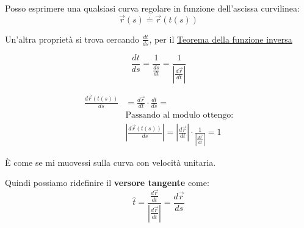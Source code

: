 Posso esprimere una qualsiasi curva regolare in funzione dell'ascissa curvilinea:
\begin{equation*}
    \vec r(s) \doteq \vec r(t(s))
\end{equation*}

Un'altra proprietà si trova cercando $\frac{dt}{ds}$, per il \underline{Teorema della funzione inversa}

\begin{equation*}
    \frac{dt}{ds} = \frac{1}{\frac{ds}{dt}} = \frac{1}{\left| \frac{d\vec r}{dt} \right|}
\end{equation*}

\begin{align*}
    \frac{d\vec r(t(s))}{ds} &= \frac{d\vec r}{dt} \cdot \frac{dt}{ds} = \\
    & \text{Passando al modulo ottengo:} \\
    & \left| \frac{d\vec r(t(s))}{ds} \right| = \left| \frac{d\vec r}{dt} \right| \cdot \frac{1}{\left| \frac{d\vec r}{dt} \right|} = 1
\end{align*}

È come se mi muovessi sulla curva con velocità unitaria.

Quindi possiamo ridefinire il \textbf{versore tangente} come:
\begin{equation*}
    \hat t = \frac{\frac{d \vec r}{dt}}{\left|\frac{d \vec r}{dt}\right|}=\frac{d \vec r}{ds}
\end{equation*}